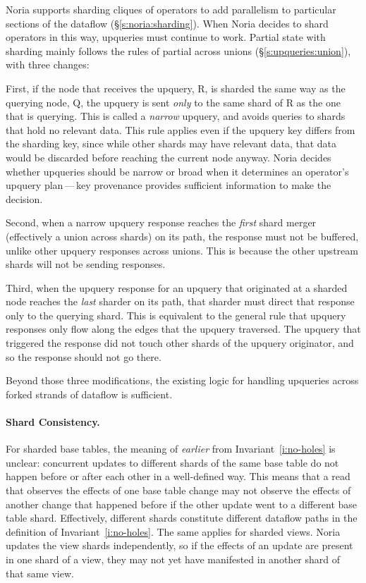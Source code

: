 Noria supports sharding cliques of operators to add parallelism to particular
sections of the dataflow (\S\ref{s:noria:sharding}). When Noria decides to shard
operators in this way, upqueries must continue to work. Partial state with
sharding mainly follows the rules of partial across unions
(\S\ref{s:upqueries:union}), with three changes:

First, if the node that receives the upquery, R, is sharded the same way as the
querying node, Q, the upquery is sent \emph{only} to the same shard of R as the
one that is querying. This is called a \textit{narrow} upquery, and avoids
queries to shards that hold no relevant data. This rule applies even if the
upquery key differs from the sharding key, since while other shards may have
relevant data, that data would be discarded before reaching the current node
anyway. Noria decides whether upqueries should be narrow or broad when it
determines an operator's upquery plan\,---\,key provenance provides sufficient
information to make the decision.

Second, when a narrow upquery response reaches the \emph{first} shard merger
(effectively a union across shards) on its path, the response must not be
buffered, unlike other upquery responses across unions. This is because
the other upstream shards will not be sending responses.

Third, when the upquery response for an upquery that originated at a sharded
node reaches the \emph{last} sharder on its path, that sharder must direct that
response only to the querying shard. This is equivalent to the general rule that
upquery responses only flow along the edges that the upquery traversed. The
upquery that triggered the response did not touch other shards of the upquery
originator, and so the response should not go there.

Beyond those three modifications, the existing logic for handling upqueries
across forked strands of dataflow is sufficient.

\paragraph{Shard Consistency.}
For sharded base tables, the meaning of \emph{earlier} from
Invariant~\ref{i:no-holes} is unclear: concurrent updates to different shards of
the same base table do not happen before or after each other in a well-defined
way. This means that a read that observes the effects of one base table change
may not observe the effects of another change that happened before if the other
update went to a different base table shard. Effectively, different shards
constitute different dataflow paths in the definition of
Invariant~\ref{i:no-holes}. The same applies for sharded views. Noria updates
the view shards independently, so if the effects of an update are present in one
shard of a view, they may not yet have manifested in another shard of that same
view.


